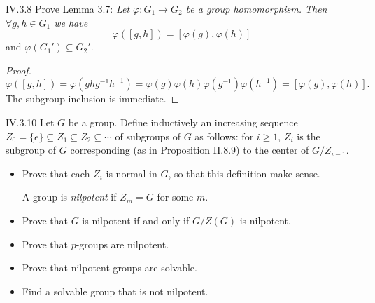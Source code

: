\begin{problem}{IV.3.8}
Prove Lemma 3.7: \emph{Let $\varphi:G_1 \to G_2$ be a group homomorphism. Then $\forall g,h \in G_1$ we have}
\[
\varphi([g,h]) = [\varphi(g),\varphi(h)]
\]
and $\varphi(G_1') \subseteq G_2'$.
\end{problem}
\begin{proof}
\[
\varphi([g,h]) = \varphi(ghg^{-1}h^{-1}) = \varphi(g)\varphi(h)\varphi(g^{-1})\varphi(h^{-1}) = [\varphi(g), \varphi(h)].	
\]
The subgroup inclusion is immediate.
\end{proof}

\begin{problem}{IV.3.10}
Let $G$ be a group. Define inductively an increasing sequence $Z_0 = \{e\} \subseteq Z_1 \subseteq Z_2 \subseteq \cdots$ of subgroups of $G$ as follows: for $i \geq 1$, $Z_i$ is the subgroup of $G$ corresponding (as in Proposition II.8.9) to the center of $G/Z_{i-1}$.
\begin{itemize}
\setlength\itemsep{0pt}
\item Prove that each $Z_i$ is normal in $G$, so that this definition make sense.

A group is \emph{nilpotent} if $Z_m = G$ for some $m$.
\item Prove that $G$ is nilpotent if and only if $G/Z(G)$ is nilpotent.
\item Prove that $p$-groups are nilpotent.
\item Prove that nilpotent groups are solvable.
\item Find a solvable group that is not nilpotent.
\end{itemize}
\end{problem}
